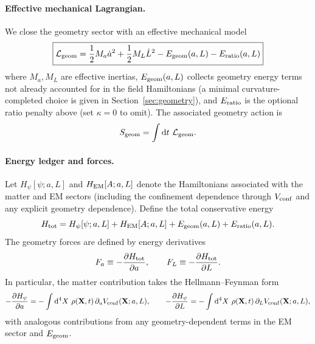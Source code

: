 \documentclass[11pt]{article}
\begin{document}
\paragraph{Effective mechanical Lagrangian.}
We close the geometry sector with an effective mechanical model
\begin{equation}
\boxed{
\mathcal L_{\rm geom}
=
\frac{1}{2}M_a \dot a^2
+
\frac{1}{2}M_L \dot L^2
-
E_{\rm geom}(a,L)
-
E_{\rm ratio}(a,L)
}
\label{eq:Lgeom}
\end{equation}
where $M_a,M_L$ are effective inertias, $E_{\rm geom}(a,L)$ collects geometry energy terms not already accounted for in the field Hamiltonians (a minimal curvature-completed choice is given in Section~\ref{sec:geometry}), and $E_{\rm ratio}$ is the optional ratio penalty above (set $\kappa=0$ to omit). The associated geometry action is
\begin{equation}
S_{\rm geom}=\int \dd t\ \mathcal L_{\rm geom}.
\end{equation}

\paragraph{Energy ledger and forces.}
Let $H_\psi[\psi; a,L]$ and $H_{\rm EM}[A;a,L]$ denote the Hamiltonians associated with the matter and EM sectors (including the confinement dependence through $V_{\rm conf}$ and any explicit geometry dependence). Define the total conservative energy
\begin{equation}
H_{\rm tot} = H_\psi[\psi;a,L] + H_{\rm EM}[A;a,L] + E_{\rm geom}(a,L) + E_{\rm ratio}(a,L).
\label{eq:Htot}
\end{equation}
The geometry forces are defined by energy derivatives
\begin{equation}
F_a \equiv -\frac{\partial H_{\rm tot}}{\partial a},
\qquad
F_L \equiv -\frac{\partial H_{\rm tot}}{\partial L}.
\label{eq:FaFL}
\end{equation}
In particular, the matter contribution takes the Hellmann--Feynman form
\begin{equation}
-\frac{\partial H_\psi}{\partial a}
=
-\int \dd^4X\ \rho(\mathbf{X},t)\,\partial_a V_{\rm conf}(\mathbf{X};a,L),
\qquad
-\frac{\partial H_\psi}{\partial L}
=
-\int \dd^4X\ \rho(\mathbf{X},t)\,\partial_L V_{\rm conf}(\mathbf{X};a,L),
\label{eq:matter-forces}
\end{equation}
with analogous contributions from any geometry-dependent terms in the EM sector and $E_{\rm geom}$.
\end{document}
